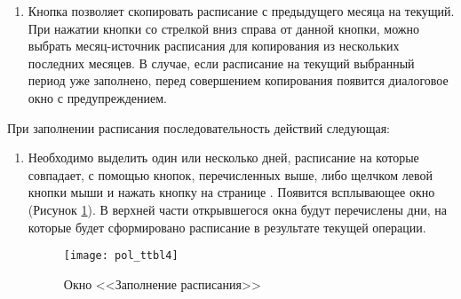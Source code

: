 {\begin{enumerate}
 \item Кнопка  позволяет скопировать расписание с предыдущего месяца на текущий. При нажатии кнопки со стрелкой вниз справа от данной кнопки, можно выбрать месяц-источник расписания для копирования из нескольких последних месяцев. В случае, если расписание на текущий выбранный период уже заполнено, перед совершением копирования появится диалоговое окно с предупреждением. 
\end{enumerate}

При заполнении расписания последовательность действий следующая: 
\begin{enumerate}
 \item \label{n2} Необходимо выделить один или несколько дней, расписание на которые совпадает, с помощью кнопок, перечисленных выше, либо щелчком левой кнопки мыши и нажать кнопку  на странице . Появится всплывающее окно  (Рисунок \ref{img_pol_ttbl4}). В верхней части открывшегося окна будут перечислены дни, на которые будет сформировано расписание в результате текущей операции. 

 \begin{figure}[ht]\centering
  \texttt{[image: pol\_ttbl4]}
  \caption{Окно <<Заполнение расписания>>}
  \label{img_pol_ttbl4}
 \end{figure}


\end{enumerate}}
